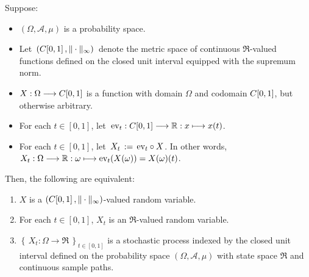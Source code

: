 \vskip 0.8cm
\begin{theorem}
\mbox{}\vskip 0.1cm
\noindent
Suppose:
\begin{itemize}
\item	$\left(\Omega,\mathcal{A},\mu\right)$ is a probability space.
\item	Let \,$(C[0,1]\,,\Vert\cdot\Vert_{\infty})$\, denote the metric space
		of continuous $\Re$-valued functions defined on the closed unit interval
		equipped with the supremum norm.
\item	$X : \Omega \longrightarrow C[0,1]$ is a function with domain $\Omega$
		and codomain $C[0,1]$, but otherwise arbitrary.
\item	For each $t \in [0,1]$, let \,$\textnormal{ev}_{t} : C[0,1] \longrightarrow \mathbb{R} : x \longmapsto x(t)$.
\item 	For each $t \in [0,1]$, let \,$X_{t} \,:=\, \textnormal{ev}_{t} \circ X$.
		In other words, $X_{t} : \Omega \longrightarrow \mathbb{R} : \omega \longmapsto \textnormal{ev}_{t}(X(\omega)) = X(\omega)(t)$.
\end{itemize}
Then, the following are equivalent:
\begin{enumerate}
\item	$X$ is a $(C[0,1]\,,\Vert\cdot\Vert_{\infty})$-valued random variable.
\item	For each $t \in [0,1]$, $X_{t}$ is an $\Re$-valued random variable.
\item	$\left\{\,X_{t}:\Omega\longrightarrow\Re\,\right\}_{t\in[0,1]}$ is a stochastic process
		indexed by the closed unit interval
		defined on the probability space $\left(\Omega,\mathcal{A},\mu\right)$
		with state space $\Re$ and continuous sample paths.
\end{enumerate}
\end{theorem}



\renewcommand{\theenumi}{\roman{enumi}}
\renewcommand{\labelenumi}{\textnormal{(\theenumi)}$\;\;$}

